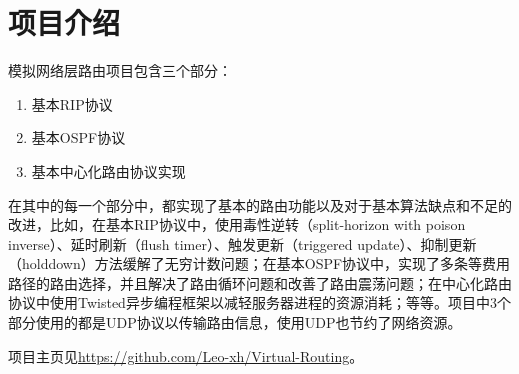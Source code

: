 \documentclass[15pt]{ctexart}
\begin{document}

\tableofcontents
\newpage
\section{项目介绍} %
\label{sec:项目介绍}
	模拟网络层路由项目包含三个部分：
	\begin{enumerate}
		\item 基本RIP协议
		\item 基本OSPF协议
		\item 基本中心化路由协议实现
	\end{enumerate}
	\par 在其中的每一个部分中，都实现了基本的路由功能以及对于基本算法缺点和不足的改进，比如，在基本RIP协议中，使用毒性逆转（split-horizon with poison inverse）、延时刷新（flush timer）、触发更新（triggered update）、抑制更新（holddown）方法缓解了无穷计数问题；在基本OSPF协议中，实现了多条等费用路径的路由选择，并且解决了路由循环问题和改善了路由震荡问题；在中心化路由协议中使用Twisted异步编程框架以减轻服务器进程的资源消耗；等等。项目中3个部分使用的都是UDP协议以传输路由信息，使用UDP也节约了网络资源。
	\par 项目主页见\url{https://github.com/Leo-xh/Virtual-Routing}。



\end{document}

